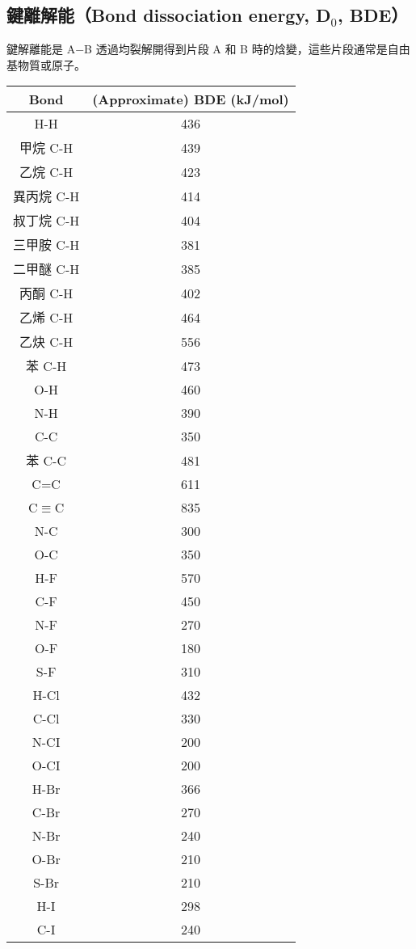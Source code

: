 \documentclass[a4paper,12pt]{report}
\begin{document}
\subsection{鍵離解能（Bond dissociation energy, D$_0$, BDE）}
鍵解離能是 A−B 透過均裂解開得到片段 A 和 B 時的焓變，這些片段通常是自由基物質或原子。
\begin{longtable}[c]{|c|c|}
\hline
Bond & (Approximate) BDE (kJ/mol)\\\hline
\endhead
H-H & 436\\\hline
甲烷 C-H & 439\\\hline
乙烷 C-H & 423\\\hline
異丙烷 C-H & 414\\\hline
叔丁烷 C-H & 404\\\hline
三甲胺 C-H & 381\\\hline
二甲醚 C-H & 385\\\hline
丙酮 C-H & 402\\\hline
乙烯 C-H & 464\\\hline
乙炔 C-H & 556\\\hline
苯 C-H & 473\\\hline
O-H & 460\\\hline
N-H & 390\\\hline
C-C & 350\\\hline
苯 C-C & 481\\\hline
C=C & 611\\\hline
C$\equiv$C & 835\\\hline
N-C & 300\\\hline
O-C & 350\\\hline
H-F & 570\\\hline
C-F & 450\\\hline
N-F & 270\\\hline
O-F & 180\\\hline
S-F & 310\\\hline
H-Cl & 432\\\hline
C-Cl & 330\\\hline
N-CI & 200\\\hline
O-CI & 200\\\hline
H-Br & 366\\\hline
C-Br & 270\\\hline
N-Br & 240\\\hline
O-Br & 210\\\hline
S-Br & 210\\\hline
H-I & 298\\\hline
C-I & 240\\\hline

\end{longtable}
\end{document}
